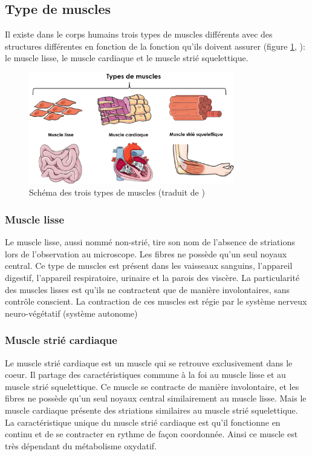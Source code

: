 \subsection{Type de muscles}
Il existe dans le corps humains trois types de muscles différents avec des structures différentes en fonction de la fonction qu'ils doivent assurer (figure \ref{fig:muscle-type}, \cite{gomez_oca_physiological_2021}): le muscle lisse, le muscle cardiaque et le muscle strié squelettique.
\begin{figure}[!htbp]
 \centering
 \includegraphics[width=0.8\textwidth]{figures/muscle_type.png}
 \caption[Schéma des trois types de muscles]{Schéma des trois types de muscles (traduit de \cite{gomez_oca_physiological_2021})}
 \label{fig:muscle-type}
\end{figure}
\subsubsection{Muscle lisse}
Le muscle lisse, aussi nommé non-strié, tire son nom de l'absence de striations lors de l'observation au microscope. Les fibres ne possède qu'un seul noyaux central. Ce type de muscles est présent dans les vaisseaux sanguins, l'appareil digestif, l'appareil respiratoire, urinaire et la parois des viscère. La particularité des muscles lisses est qu'ils ne contractent que de manière involontaires, sans contrôle conscient. La contraction de ces muscles est régie par le système nerveux neuro-végétatif (système autonome)

\subsubsection{Muscle strié cardiaque}
Le muscle strié cardiaque est un muscle qui se retrouve exclusivement dans le coeur. Il partage des caractéristiques commune à la foi au muscle lisse et au muscle strié squelettique. Ce muscle se contracte de manière involontaire, et les fibres ne possède qu'un seul noyaux central similairement au muscle lisse. Mais le muscle cardiaque présente des striations similaires au muscle strié squelettique. La caractéristique unique du muscle strié cardiaque est qu'il fonctionne en continu et de se contracter en rythme de façon coordonnée. Ainsi ce muscle est très dépendant du métabolisme oxydatif.

